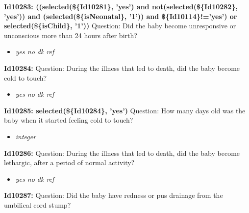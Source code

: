 \documentclass{article}%
\begin{document}
\textbf{Id10283: ((selected(\$\{Id10281\}, 'yes') and not(selected(\$\{Id10282\}, 'yes')) and (selected(\$\{isNeonatal\}, '1')) and \$\{Id10114\}!='yes') or selected(\$\{isChild\}, '1'))\newline%
}%
Question: Did the baby become unresponsive or unconscious more than 24 hours after birth?\newline%
%
\begin{itemize}%
\item%
\textit{yes\newline%
 no\newline%
 dk\newline%
 ref\newline%
}%
\end{itemize}%
\textbf{Id10284: \newline%
}%
Question: During the illness that led to death, did the baby become cold to touch?\newline%
%
\begin{itemize}%
\item%
\textit{yes\newline%
 no\newline%
 dk\newline%
 ref\newline%
}%
\end{itemize}%
\textbf{Id10285: selected(\$\{Id10284\}, 'yes')\newline%
}%
Question: How many days old was the baby when it started feeling cold to touch?\newline%
%
\begin{itemize}%
\item%
\textit{integer\newline%
}%
\end{itemize}%
\textbf{Id10286: \newline%
}%
Question: During the illness that led to death, did the baby become lethargic, after a period of normal activity?\newline%
%
\begin{itemize}%
\item%
\textit{yes\newline%
 no\newline%
 dk\newline%
 ref\newline%
}%
\end{itemize}%
\textbf{Id10287: \newline%
}%
Question: Did the baby have redness or pus drainage from the umbilical cord stump?\newline%
\end{document}
